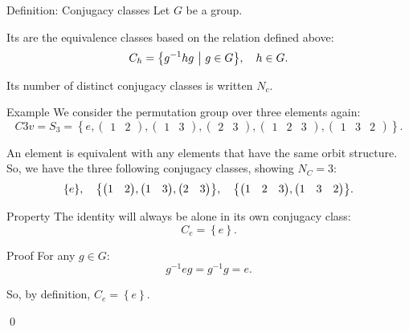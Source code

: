\documentclass[a4paper]{article}
\begin{document}
\begin{parag}{Definition: Conjugacy classes}
    Let $G$ be a group.

    Its  are the equivalence classes based on the relation defined above: 
    \[C_h = \left\{g^{-1} h g \suchthat g \in G\right\}, \mathspace h \in G.\]

    Its number of distinct conjugacy classes is written $N_c$.
\end{parag}

\begin{parag}{Example}
    We consider the permutation group over three elements again: 
    \[C3v = S_3 = \left\{e, \begin{pmatrix} 1 & 2 \end{pmatrix}, \begin{pmatrix} 1 & 3 \end{pmatrix}, \begin{pmatrix} 2 & 3 \end{pmatrix}, \begin{pmatrix} 1 & 2 & 3 \end{pmatrix}, \begin{pmatrix} 1 & 3 & 2 \end{pmatrix}\right\}.\]

    An element is equivalent with any elements that have the same orbit structure. So, we have the three following conjugacy classes, showing $N_C = 3$: 
    \[\left\{e\right\}, \mathspace \left\{\begin{pmatrix} 1 & 2 \end{pmatrix}, \begin{pmatrix} 1 & 3 \end{pmatrix}, \begin{pmatrix} 2 & 3 \end{pmatrix}\right\}, \mathspace \left\{\begin{pmatrix} 1 & 2 & 3 \end{pmatrix}, \begin{pmatrix} 1 & 3 & 2 \end{pmatrix}\right\}.\]
\end{parag}

\begin{parag}{Property}
    The identity will always be alone in its own conjugacy class: 
    \[C_e = \left\{e\right\}.\]

    \begin{subparag}{Proof}
        For any $g \in G$: 
        \[g^{-1} e g = g^{-1} g = e.\]

        So, by definition, $C_e = \left\{e\right\}$.

        \qed
    \end{subparag}
\end{parag}
\end{document}

